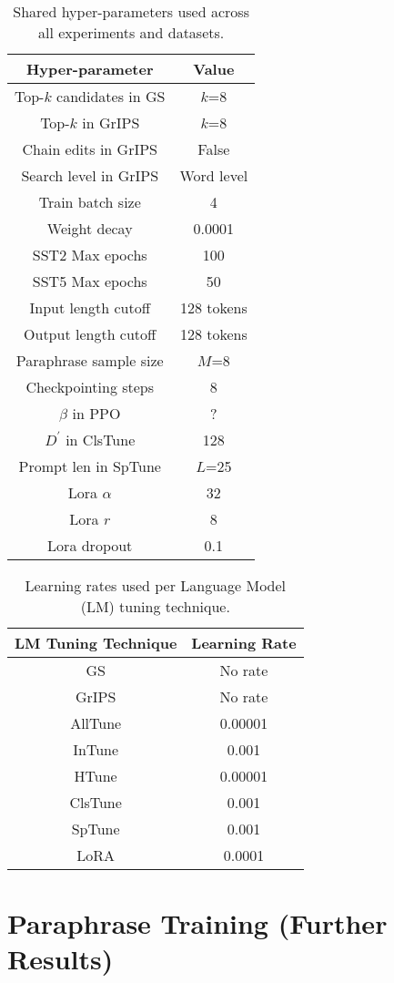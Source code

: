 \documentclass[11pt]{article}
\begin{document}
\begin{table}[t]
\centering
\caption{Shared hyper-parameters used across all experiments and datasets.}
\begin{tabular}{ c | c }
\hline
Hyper-parameter & Value\\
\hline
Top-$k$ candidates in GS & $k$=8 \\
Top-$k$ in GrIPS & $k$=8 \\
Chain edits in GrIPS & False \\
Search level in GrIPS & Word level \\
Train batch size & 4 \\
Weight decay & 0.0001 \\
SST2 Max epochs & 100 \\
SST5 Max epochs & 50 \\
Input length cutoff & 128 tokens \\
Output length cutoff & 128 tokens \\
Paraphrase sample size & $M$=8 \\
Checkpointing steps & 8 \\
$\beta$ in PPO & ? \\
$D^{'}$ in ClsTune & 128 \\
Prompt len in SpTune & $L$=25 \\
Lora $\alpha$ & 32 \\
Lora $r$ & 8 \\
Lora dropout & 0.1 \\
\end{tabular}
\label{hyper-parameters}
\end{table}

\begin{table}[t]
\centering
\caption{Learning rates used per Language Model (LM) tuning technique.}
\begin{tabular}{ c | c }
\hline
LM Tuning Technique & Learning Rate\\
\hline
GS & No rate \\
GrIPS & No rate \\
AllTune & 0.00001 \\
InTune &  0.001 \\
HTune & 0.00001 \\
ClsTune & 0.001 \\
SpTune & 0.001 \\
LoRA & 0.0001
\end{tabular}
\label{learning-rates}
\end{table}

\section{Paraphrase Training (Further Results)}
\label{training-paraphrase-extra:appendix}
\end{document}
